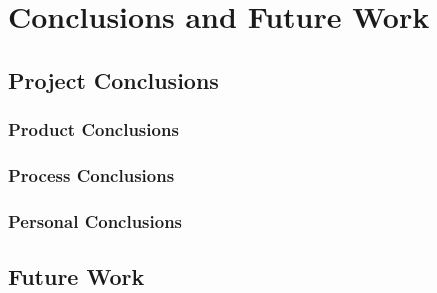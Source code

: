 \chapter{Conclusions and Future Work}

\section{Project Conclusions}

\subsection{Product Conclusions}

\subsection{Process Conclusions}

\subsection{Personal Conclusions}


\section{Future Work}